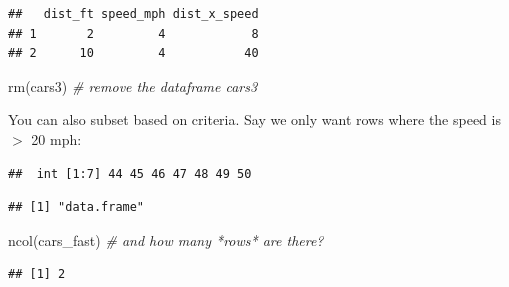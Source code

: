 \documentclass[
  11pt,
  a4paper,
]{book}
\newenvironment{Shaded}{\begin{snugshade}}{\end{snugshade}}
\newcommand{\CommentTok}[1]{\textcolor[rgb]{0.56,0.35,0.01}{\textit{#1}}}
\newcommand{\DecValTok}[1]{\textcolor[rgb]{0.00,0.00,0.81}{#1}}
\newcommand{\FunctionTok}[1]{\textcolor[rgb]{0.00,0.00,0.00}{#1}}
\newcommand{\NormalTok}[1]{#1}
\newcommand{\OtherTok}[1]{\textcolor[rgb]{0.56,0.35,0.01}{#1}}
\newcommand{\SpecialCharTok}[1]{\textcolor[rgb]{0.00,0.00,0.00}{#1}}
\begin{document}
\begin{verbatim}
##   dist_ft speed_mph dist_x_speed
## 1       2         4            8
## 2      10         4           40
\end{verbatim}

\begin{Shaded}
\begin{Highlighting}[]
\FunctionTok{rm}\NormalTok{(cars3) }\CommentTok{\# remove the dataframe \textquotesingle{}cars3\textquotesingle{}}
\end{Highlighting}
\end{Shaded}

You can also subset based on criteria. Say we only want rows where the speed is \(>\) 20 mph:

\begin{Shaded}
\end{Shaded}

\begin{verbatim}
##  int [1:7] 44 45 46 47 48 49 50
\end{verbatim}

\begin{Shaded}
\end{Shaded}

\begin{verbatim}
## [1] "data.frame"
\end{verbatim}

\begin{Shaded}
\begin{Highlighting}[]
\FunctionTok{ncol}\NormalTok{(cars\_fast)  }\CommentTok{\# and how many *rows* are there?}
\end{Highlighting}
\end{Shaded}

\begin{verbatim}
## [1] 2
\end{verbatim}
\end{document}
